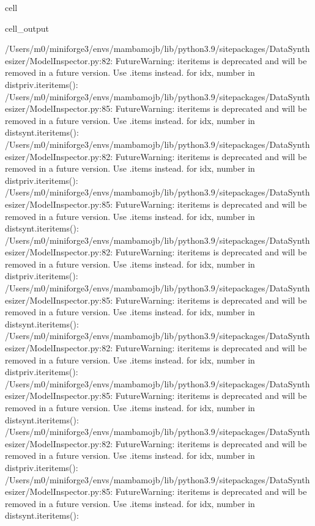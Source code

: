 \documentclass[letterpaper,10pt,english]{jupyterBook}
\begin{document}
\begin{sphinxuseclass}{cell}
\begin{sphinxVerbatimOutput}
\begin{sphinxuseclass}{cell_output}
\begin{sphinxVerbatim}[commandchars=\\\{\}]
/Users/m0/miniforge3/envs/mambamojb/lib/python3.9/site\PYGZhy{}packages/DataSynthesizer/ModelInspector.py:82: FutureWarning: iteritems is deprecated and will be removed in a future version. Use .items instead.
  for idx, number in dist\PYGZus{}priv.iteritems():
/Users/m0/miniforge3/envs/mambamojb/lib/python3.9/site\PYGZhy{}packages/DataSynthesizer/ModelInspector.py:85: FutureWarning: iteritems is deprecated and will be removed in a future version. Use .items instead.
  for idx, number in dist\PYGZus{}synt.iteritems():
/Users/m0/miniforge3/envs/mambamojb/lib/python3.9/site\PYGZhy{}packages/DataSynthesizer/ModelInspector.py:82: FutureWarning: iteritems is deprecated and will be removed in a future version. Use .items instead.
  for idx, number in dist\PYGZus{}priv.iteritems():
/Users/m0/miniforge3/envs/mambamojb/lib/python3.9/site\PYGZhy{}packages/DataSynthesizer/ModelInspector.py:85: FutureWarning: iteritems is deprecated and will be removed in a future version. Use .items instead.
  for idx, number in dist\PYGZus{}synt.iteritems():
/Users/m0/miniforge3/envs/mambamojb/lib/python3.9/site\PYGZhy{}packages/DataSynthesizer/ModelInspector.py:82: FutureWarning: iteritems is deprecated and will be removed in a future version. Use .items instead.
  for idx, number in dist\PYGZus{}priv.iteritems():
/Users/m0/miniforge3/envs/mambamojb/lib/python3.9/site\PYGZhy{}packages/DataSynthesizer/ModelInspector.py:85: FutureWarning: iteritems is deprecated and will be removed in a future version. Use .items instead.
  for idx, number in dist\PYGZus{}synt.iteritems():
/Users/m0/miniforge3/envs/mambamojb/lib/python3.9/site\PYGZhy{}packages/DataSynthesizer/ModelInspector.py:82: FutureWarning: iteritems is deprecated and will be removed in a future version. Use .items instead.
  for idx, number in dist\PYGZus{}priv.iteritems():
/Users/m0/miniforge3/envs/mambamojb/lib/python3.9/site\PYGZhy{}packages/DataSynthesizer/ModelInspector.py:85: FutureWarning: iteritems is deprecated and will be removed in a future version. Use .items instead.
  for idx, number in dist\PYGZus{}synt.iteritems():
/Users/m0/miniforge3/envs/mambamojb/lib/python3.9/site\PYGZhy{}packages/DataSynthesizer/ModelInspector.py:82: FutureWarning: iteritems is deprecated and will be removed in a future version. Use .items instead.
  for idx, number in dist\PYGZus{}priv.iteritems():
/Users/m0/miniforge3/envs/mambamojb/lib/python3.9/site\PYGZhy{}packages/DataSynthesizer/ModelInspector.py:85: FutureWarning: iteritems is deprecated and will be removed in a future version. Use .items instead.
  for idx, number in dist\PYGZus{}synt.iteritems():
\end{sphinxVerbatim}


\end{sphinxuseclass}
\end{sphinxVerbatimOutput}
\end{sphinxuseclass}
\end{document}
